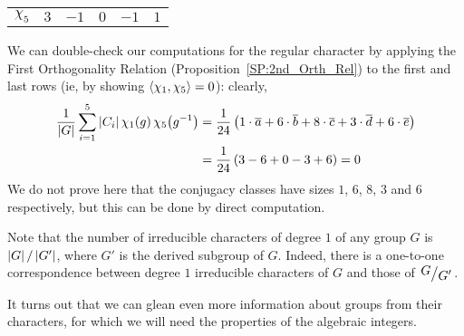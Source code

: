 \begin{boxexample}[$S_4$]
\begin{table}[H]
\begin{tabular}{c|ccccc}
            $\chi_5$ & $3$ & $-1$ & $0$ & $-1$ & $1$
        \end{tabular}
    \end{table}
    We can double-check our computations for the regular character by applying the First Orthogonality Relation (Proposition~\ref{SP:2nd_Orth_Rel}) to the first and last rows (ie, by showing $\left\langle \chi_1, \chi_5 \right\rangle = 0$): clearly,
    \begin{align*}
        \frac{1}{\left\lvert G \right\rvert} \sum_{i=1}^{5} \left\lvert C_i \right\rvert \chi_{1}\!\left( g \right)\chi_{5}\!\left( g^{-1} \right) &= \frac{1}{24} \left( 1 \cdot \overline{a} + 6 \cdot \overline{b} + 8 \cdot \overline{c} + 3 \cdot \overline{d} + 6 \cdot \overline{e} \right) \\
        &= \frac{1}{24}\left( 3 - 6 + 0 - 3 + 6 \right) = 0
    \end{align*}
    We do not prove here that the conjugacy classes have sizes $1$, $6$, $8$, $3$ and $6$ respectively, but this can be done by direct computation.
\end{boxexample}

Note that the number of irreducible characters of degree $1$ of any group $G$ is $\left\lvert G \right\rvert / \left\lvert G' \right\rvert$, where $G'$ is the derived subgroup of $G$. Indeed, there is a one-to-one correspondence between degree $1$ irreducible characters of $G$ and those of $\quotient{G}{G'}$.

It turns out that we can glean even more information about groups from their characters, for which we will need the properties of the algebraic integers.